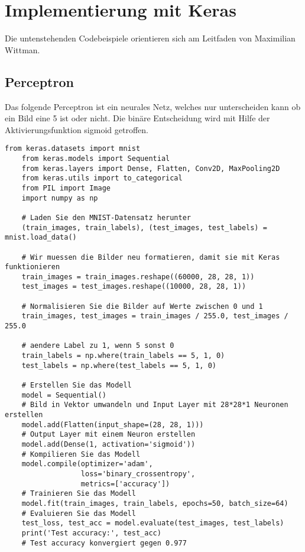 \section{Implementierung mit Keras}\label{sec:code} 
Die untenstehenden Codebeispiele orientieren sich am Leitfaden von Maximilian Wittman. \cite{WM20}
\subsection{Perceptron}
Das folgende Perceptron ist ein neurales Netz, welches nur unterscheiden kann ob ein Bild eine 5 ist oder nicht. Die binäre Entscheidung wird mit Hilfe
der Aktivierungsfunktion sigmoid getroffen.
\begin{lstlisting}[basicstyle=\ttfamily\footnotesize]
    from keras.datasets import mnist
    from keras.models import Sequential
    from keras.layers import Dense, Flatten, Conv2D, MaxPooling2D
    from keras.utils import to_categorical
    from PIL import Image
    import numpy as np
    
    # Laden Sie den MNIST-Datensatz herunter
    (train_images, train_labels), (test_images, test_labels) = mnist.load_data()
    
    # Wir muessen die Bilder neu formatieren, damit sie mit Keras funktionieren
    train_images = train_images.reshape((60000, 28, 28, 1))
    test_images = test_images.reshape((10000, 28, 28, 1))
    
    # Normalisieren Sie die Bilder auf Werte zwischen 0 und 1
    train_images, test_images = train_images / 255.0, test_images / 255.0
    
    # aendere Label zu 1, wenn 5 sonst 0
    train_labels = np.where(train_labels == 5, 1, 0)
    test_labels = np.where(test_labels == 5, 1, 0)
    
    # Erstellen Sie das Modell
    model = Sequential()
    # Bild in Vektor umwandeln und Input Layer mit 28*28*1 Neuronen erstellen
    model.add(Flatten(input_shape=(28, 28, 1)))
    # Output Layer mit einem Neuron erstellen
    model.add(Dense(1, activation='sigmoid'))
    # Kompilieren Sie das Modell
    model.compile(optimizer='adam',
                  loss='binary_crossentropy',
                  metrics=['accuracy'])
    # Trainieren Sie das Modell
    model.fit(train_images, train_labels, epochs=50, batch_size=64)
    # Evaluieren Sie das Modell
    test_loss, test_acc = model.evaluate(test_images, test_labels)
    print('Test accuracy:', test_acc)
    # Test accuracy konvergiert gegen 0.977
\end{lstlisting}


